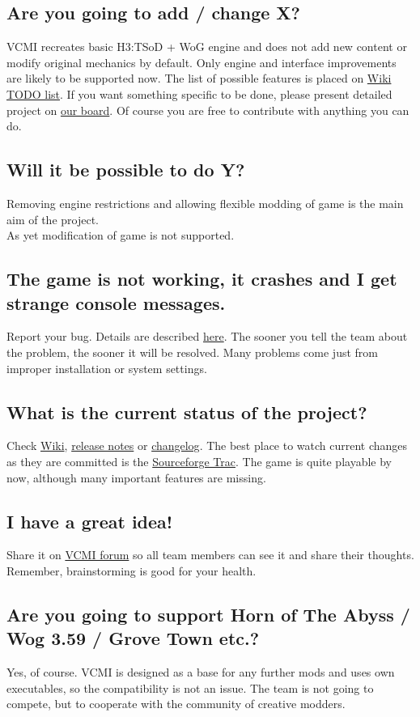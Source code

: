 \documentclass[a4size,final]{article}
\begin{document}
\subsection{Are you going to add / change X?}
VCMI recreates basic H3:TSoD + WoG engine and does not add new content or modify original mechanics by default. Only engine and interface improvements are likely to be supported now. The list of possible features is placed on \href{http://wiki.vcmi.eu/index.php?title=TODO_list}{Wiki TODO list}.
If you want something specific to be done, please present detailed project on \href{http://forum.vcmi.eu/index.php}{our board}. Of course you are free to contribute with anything you can do.
\subsection{Will it be possible to do Y?}
Removing engine restrictions and allowing flexible modding of game is the main aim of the project.\\
As yet modification of game is not supported.
\subsection{The game is not working, it crashes and I get strange console messages.}
Report your bug. Details are described \hyperref[Feedback]{here}. The sooner you tell the team about the problem, the sooner it will be resolved. Many problems come just from improper installation or system settings.
\subsection{What is the current status of the project?}
Check \href{http://wiki.vcmi.eu/index.php?title=VCMI}{Wiki}, \href{http://forum.vcmi.eu/viewforum.php?f=1}{release notes} or \href{https://vcmi.svn.sourceforge.net/svnroot/vcmi/trunk/ChangeLog}{changelog}. The best place to watch current changes as they are committed is the \href{http://sourceforge.net/apps/trac/vcmi/timeline}{Sourceforge Trac}. The game is quite playable by now, although many important features are missing.
\subsection{I have a great idea!}
Share it on \href{http://forum.vcmi.eu/index.php}{VCMI forum} so all team members can see it and share their thoughts. Remember, brainstorming is good for your health.
\subsection{Are you going to support Horn of The Abyss / Wog 3.59 / Grove Town etc.?}
Yes, of course. VCMI is designed as a base for any further mods and uses own executables, so the compatibility is not an issue. The team is not going to compete, but to cooperate with the community of creative modders.
\end{document}
